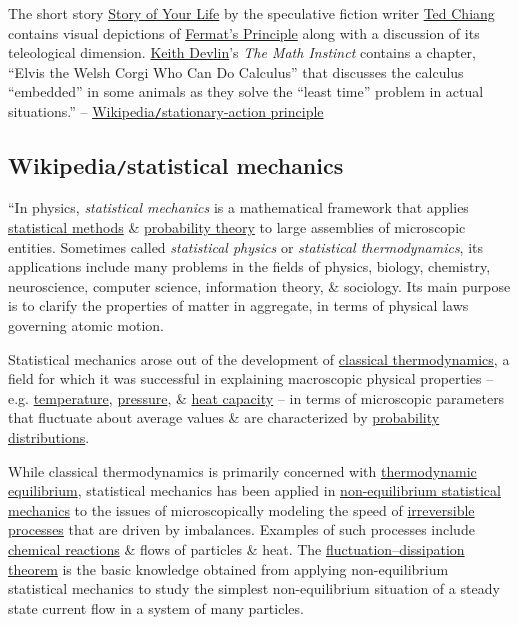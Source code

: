 \documentclass{article}
\begin{document}
The short story \href{https://en.wikipedia.org/wiki/Story_of_Your_Life}{Story of Your Life} by the speculative fiction writer \href{https://en.wikipedia.org/wiki/Ted_Chiang}{Ted Chiang} contains visual depictions of \href{https://en.wikipedia.org/wiki/Fermat%27s_Principle}{Fermat's Principle} along with a discussion of its teleological dimension. \href{https://en.wikipedia.org/wiki/Keith_Devlin}{Keith Devlin}'s \textit{The Math Instinct} contains a chapter, ``Elvis the Welsh Corgi Who Can Do Calculus'' that discusses the calculus ``embedded'' in some animals as they solve the ``least time'' problem in actual situations.'' -- \href{https://en.wikipedia.org/wiki/Stationary-action_principle}{Wikipedia{\tt/}stationary-action principle}


\subsection{Wikipedia{\tt/}statistical mechanics}
``In physics, {\it statistical mechanics} is a mathematical framework that applies \href{https://en.wikipedia.org/wiki/Statistics}{statistical methods} \& \href{https://en.wikipedia.org/wiki/Probability_theory}{probability theory} to large assemblies of microscopic entities. Sometimes called {\it statistical physics} or {\it statistical thermodynamics}, its applications include many problems in the fields of physics, biology, chemistry, neuroscience, computer science, information theory, \& sociology. Its main purpose is to clarify the properties of matter in aggregate, in terms of physical laws governing atomic motion.

Statistical mechanics arose out of the development of \href{https://en.wikipedia.org/wiki/Classical_thermodynamics}{classical thermodynamics}, a field for which it was successful in explaining macroscopic physical properties -- e.g. \href{https://en.wikipedia.org/wiki/Temperature}{temperature}, \href{https://en.wikipedia.org/wiki/Pressure}{pressure}, \& \href{https://en.wikipedia.org/wiki/Heat_capacity}{heat capacity} -- in terms of microscopic parameters that fluctuate about average values \& are characterized by \href{https://en.wikipedia.org/wiki/Probability_distribution}{probability distributions}.

While classical thermodynamics is primarily concerned with \href{https://en.wikipedia.org/wiki/Thermodynamic_equilibrium}{thermodynamic equilibrium}, statistical mechanics has been applied in \href{https://en.wikipedia.org/wiki/Non-equilibrium_statistical_mechanics}{non-equilibrium statistical mechanics} to the issues of microscopically modeling the speed of \href{https://en.wikipedia.org/wiki/Irreversible_process}{irreversible processes} that are driven by imbalances. Examples of such processes include \href{https://en.wikipedia.org/wiki/Chemical_reaction}{chemical reactions} \& flows of particles \& heat. The \href{https://en.wikipedia.org/wiki/Fluctuation%E2%80%93dissipation_theorem}{fluctuation--dissipation theorem} is the basic knowledge obtained from applying non-equilibrium statistical mechanics to study the simplest non-equilibrium situation of a steady state current flow in a system of many particles.
\end{document}
